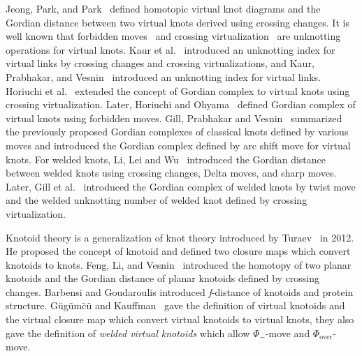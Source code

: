 \documentclass[11pt]{amsart}
\theoremstyle{noparens}
\numberwithin{equation}{section}
\numberwithin{equation}{section}
\begin{document}
Jeong, Park, and Park~\citep{Jeong2017Polynomials} defined homotopic virtual knot diagrams and the Gordian distance between two virtual knots derived using crossing changes.
It is well known that forbidden moves~\citep{kanenobu2001forbidden,nelson2001unknotting} and crossing virtualization~\citep{Ohyama2019Virtualization} are unknotting operations for virtual knots. Kaur et al.~\citep{KKKM2019} introduced an unknotting index for virtual links by crossing changes and crossing virtualizations, and Kaur, Prabhakar, and Vesnin~\citep{Kaur2019} introduced an unknotting index for virtual links.  
Horiuchi et al.~\citep{Horiuchi2012Gordian} extended the concept of Gordian complex to virtual knots using crossing virtualization. Later, Horiuchi and Ohyama~\citep{Horiuchi2013Gordian} defined Gordian complex of virtual knots using forbidden moves. Gill, Prabhakar and Vesnin~\citep{gill2019gordian} summarized the previously proposed Gordian complexes of classical knots defined by various moves and introduced the Gordian complex defined by arc shift move for virtual knots.
For welded knots, Li, Lei and Wu~\citep{li2017unknotting} introduced the Gordian distance between welded knots using crossing changes, Delta moves, and sharp moves. Later, Gill et al.~\citep{Gill2021UnknottingInvariant} introduced the Gordian complex of welded knots by twist move and the welded unknotting number of welded knot defined by crossing virtualization. 


Knotoid theory is a generalization of knot theory introduced  by  Turaev~\citep{turaev2012knotoids} in 2012. He proposed the concept of knotoid and defined two closure maps which convert knotoids to knots. Feng, Li, and Vesnin~\citep{feng2025three} introduced the homotopy of two planar knotoids and the Gordian distance of planar knotoids defined by crossing changes.
Barbensi and Goudaroulis \citep{Barbensi2021} introduced  \textit{f}-distance of knotoids and protein structure.
 G{\"u}g{\"u}m{\"c}{\"u} and Kauffman~\citep{gugumcu2017new} gave the definition of virtual knotoids and the virtual closure map which convert virtual knotoids to virtual knots, they also gave the definition of \textit{welded virtual knotoids} which allow $\Phi_-$-move and $\Phi_{\text{over}}$-move. 
 
\end{document}
